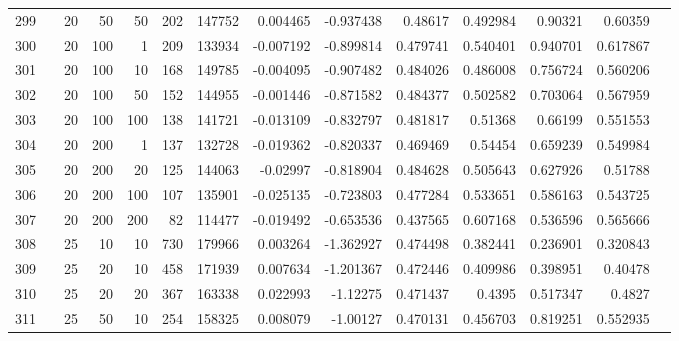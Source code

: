 \begin{longtable}{llrrrrrrrrrrrr}
		299 & &           20 &                50 &           50 &         202 &     147752 &  0.004465 & -0.937438 &   0.48617 &    0.492984 &        0.90321 &   0.60359 \\
		300 & &           20 &               100 &            1 &         209 &     133934 & -0.007192 & -0.899814 &  0.479741 &    0.540401 &       0.940701 &  0.617867 \\
		301 & &           20 &               100 &           10 &         168 &     149785 & -0.004095 & -0.907482 &  0.484026 &    0.486008 &       0.756724 &  0.560206 \\
		302 & &           20 &               100 &           50 &         152 &     144955 & -0.001446 & -0.871582 &  0.484377 &    0.502582 &       0.703064 &  0.567959 \\
		303 & &           20 &               100 &          100 &         138 &     141721 & -0.013109 & -0.832797 &  0.481817 &     0.51368 &        0.66199 &  0.551553 \\
		304 & &           20 &               200 &            1 &         137 &     132728 & -0.019362 & -0.820337 &  0.469469 &     0.54454 &       0.659239 &  0.549984 \\
		305 & &           20 &               200 &           20 &         125 &     144063 &  -0.02997 & -0.818904 &  0.484628 &    0.505643 &       0.627926 &   0.51788 \\
		306 & &           20 &               200 &          100 &         107 &     135901 & -0.025135 & -0.723803 &  0.477284 &    0.533651 &       0.586163 &  0.543725 \\
		307 & &           20 &               200 &          200 &          82 &     114477 & -0.019492 & -0.653536 &  0.437565 &    0.607168 &       0.536596 &  0.565666 \\
		308 & &           25 &                10 &           10 &         730 &     179966 &  0.003264 & -1.362927 &  0.474498 &    0.382441 &       0.236901 &  0.320843 \\
		309 & &           25 &                20 &           10 &         458 &     171939 &  0.007634 & -1.201367 &  0.472446 &    0.409986 &       0.398951 &   0.40478 \\
		310 & &           25 &                20 &           20 &         367 &     163338 &  0.022993 &  -1.12275 &  0.471437 &      0.4395 &       0.517347 &    0.4827 \\
		311 & &           25 &                50 &           10 &         254 &     158325 &  0.008079 &  -1.00127 &  0.470131 &    0.456703 &       0.819251 &  0.552935 \\

\end{longtable}
